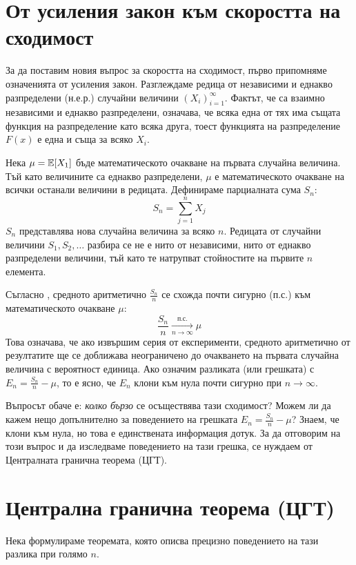 \section{От усиления закон към скоростта на сходимост}

За да поставим новия въпрос за скоростта на сходимост, първо припомняме означенията от усиления закон. Разглеждаме редица от независими и еднакво разпределени (н.е.р.) случайни величини $(X_i)_{i=1}^\infty$. Фактът, че са взаимно независими и еднакво разпределени, означава, че всяка една от тях има същата функция на разпределение като всяка друга, тоест функцията на разпределение $F(x)$ е една и съща за всяко $X_i$.

Нека $\mu = \mathbb{E}[X_1]$ бъде математическото очакване на първата случайна величина. Тъй като величините са еднакво разпределени, $\mu$ е математическото очакване на всички останали величини в редицата. Дефинираме парциалната сума $S_n$:
\[ S_n = \sum_{j=1}^n X_j \]
$S_n$ представлява нова случайна величина за всяко $n$. Редицата от случайни величини $S_1, S_2, \dots$ разбира се не е нито от независими, нито от еднакво разпределени величини, тъй като те натрупват стойностите на първите $n$ елемента.

Съгласно , средното аритметично $\frac{S_n}{n}$ се схожда почти сигурно (п.с.) към математическото очакване $\mu$:
\[ \frac{S_n}{n} \xrightarrow[n \to \infty]{\text{п.с.}} \mu \]
Това означава, че ако извършим серия от експерименти, средното аритметично от резултатите ще се доближава неограничено до очакването на първата случайна величина с вероятност единица. Ако означим разликата (или грешката) с $E_n = \frac{S_n}{n} - \mu$, то е ясно, че $E_n$ клони към нула почти сигурно при $n \to \infty$.

Въпросът обаче е: \emph{колко бързо} се осъществява тази сходимост? Можем ли да кажем нещо допълнително за поведението на грешката $E_n = \frac{S_n}{n} - \mu$? Знаем, че клони към нула, но това е единствената информация дотук. За да отговорим на този въпрос и да изследваме поведението на тази грешка, се нуждаем от Централната гранична теорема (ЦГТ).

\section{Централна гранична теорема (ЦГТ)}

Нека формулираме теоремата, която описва прецизно поведението на тази разлика при голямо $n$.


